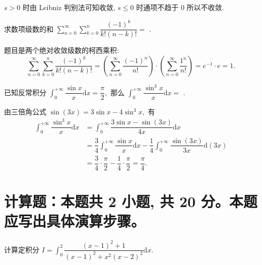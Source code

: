 \begin{solution}
$s > 0$ 时由 Leibniz 判别法可知收敛, $s \leqslant 0$ 时通项不趋于 $0$ 所以不收敛.
\end{solution}

\begin{question}
求数项级数的和 $\displaystyle \sum_{n=0}^{\infty} \sum_{k=0}^n \dfrac{(-1)^k}{k!(n-k)!} =$ \fillin[1].
\end{question}

\begin{solution}
题目是两个绝对收敛级数的柯西乘积:
\[\sum_{n=0}^{\infty} \sum_{k=0}^n \dfrac{(-1)^k}{k!(n-k)!} = \left( \sum_{n=0}^{\infty} \dfrac{(-1)^n}{n!} \right) \cdot \left( \sum_{n=0}^{\infty} \dfrac{1^n}{n!} \right) = e^{-1} \cdot e = 1.\]
\end{solution}

\begin{question}
已知反常积分 $\int_0^{+\infty} \dfrac{\sin x}{x} \mathrm{d} x = \dfrac{\pi}{2},$ 那么 $\int_0^{+\infty} \dfrac{\sin^3 x}{x} \mathrm{d} x =$ \fillin[$\dfrac{\pi}{4}$].
\end{question}

\begin{solution}
由三倍角公式 $\displaystyle \sin(3x) = 3\sin x - 4\sin^{3} x,$ 有
\begin{equation*}
\begin{aligned}
\int_0^{+\infty} \dfrac{\sin^3 x}{x} \mathrm{d} x & = \int_0^{+\infty} \dfrac{3\sin x - \sin(3x)}{4x} \mathrm{d} x \\
& = \dfrac{3}{4} \int_0^{+\infty} \dfrac{\sin x}{x} \mathrm{d} x - \dfrac{1}{4} \int_0^{+\infty} \dfrac{\sin (3x)}{3x} \mathrm{d} (3x) \\
& = \dfrac{3}{4} \cdot \dfrac{\pi}{2} - \dfrac{1}{4} \cdot \dfrac{\pi}{2} = \dfrac{\pi}{4}.
\end{aligned}
\end{equation*}
\end{solution}


\section{计算题：本题共 2 小题, 共 20 分。本题应写出具体演算步骤。}


\begin{question}[points = 10]
计算定积分 $\displaystyle I = \int_0^2 \dfrac{(x-1)^2 + 1}{(x-1)^2 + x^2(x-2)^2} \mathrm{d} x.$

\end{question}

